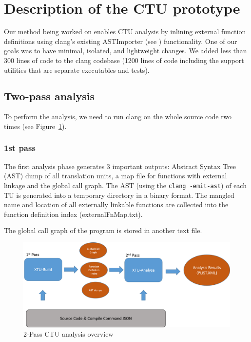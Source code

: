 \documentclass{article}
\begin{document}

\section{Description of the CTU prototype}
Our method being worked on enables CTU analysis 
by inlining external function definitions using clang's \cite{clang} existing ASTImporter 
(see \cite{astimporter}) functionality.
One of our goals was to have minimal, isolated, and lightweight changes.
We added less than 300 lines of code to the clang codebase 
(1200 lines of code including the support utilities that are 
  separate executables and tests). 

\subsection{Two-pass analysis}
To perform the analysis, we need to run clang on the whole source code two times 
(see Figure~\ref{figctu}).

\subsubsection*{1st pass}
The first analysis phase generates 3 important outputs: Abstract Syntax Tree (AST) dump of all
translation units, a map file for functions with external linkage and the global call graph.
The AST (using the {\tt clang -emit-ast}) 
of each TU is generated into a temporary directory in a binary format. 
The mangled name and location of all externally linkable functions 
are collected into the function definition index (externalFnMap.txt). 

The global call graph of the program is stored in another text file.

\begin{figure}[h!]
\includegraphics[width=\textwidth]{images/ctu.png}
\caption{2-Pass CTU analysis overview}
\label{figctu}
\end{figure}
\end{document}
